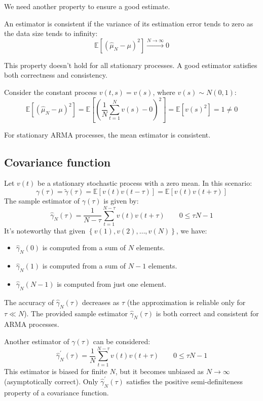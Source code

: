 We need another property to ensure a good estimate. 
\begin{definition}
    An estimator is consistent if the variance of its estimation error tends to zero as the data size tends to infinity:
    \[\mathbb{E}\left[\left(\hat{\mu}_N-\mu\right)^2\right]\overset{N\rightarrow\infty}{\longrightarrow}0\]
\end{definition}
This property doesn't hold for all stationary processes. 
A good estimator satisfies both correctness and consistency.
\begin{example}
    Consider the constant process $v(t,s)=v(s)$, where $v(s) \sim N(0,1)$: 
    \[\mathbb{E}\left[\left(\hat{\mu}_N-\mu\right)^2\right]=\mathbb{E}\left[\left(\dfrac{1}{N}\sum_{t=1}^{N}v(s)-0\right)^2\right]=\mathbb{E}\left[v(s)^2\right]=1\neq 0\]
\end{example}

For stationary ARMA processes, the mean estimator is consistent.

\subsection{Covariance function}
Let $v(t)$ be a stationary stochastic process with a zero mean. 
In this scenario:
\[\gamma(\tau)=\tilde{\gamma}(\tau)=\mathbb{E}\left[ v(t)v(t-\tau) \right]=\mathbb{E}\left[v(t)v(t+\tau)\right]\]
The sample estimator of $\gamma(\tau)$ is given by: 
\[\hat{\gamma}_N(\tau)=\dfrac{1}{N-\tau}\sum_{t=1}^{N-\tau}v(t)v(t+\tau) \qquad 0 \leq \tau N-1\]
It's noteworthy that given $\left\{v(1), v(2), \dots, v(N)\right\}$, we have:
\begin{itemize}
    \item $\hat{\gamma}_N(0)$ is computed from a sum of $N$ elements.
    \item $\hat{\gamma}_N(1)$ is computed from a sum of $N-1$ elements.
    \item $\hat{\gamma}_N(N-1)$ is computed from just one element.
\end{itemize}
The accuracy of $\hat{\gamma}_N(\tau)$ decreases as $\tau$ (the approximation is reliable only for $\tau \ll N$).
The provided sample estimator $\hat{\gamma}_N(\tau)$ is both correct and consistent for ARMA processes.

Another estimator of $\gamma(\tau)$ can be considered:
\[\hat{\gamma}_N^{\prime}(\tau)=\dfrac{1}{N}\sum_{t=1}^{N-\tau}v(t)v(t+\tau) \qquad 0 \leq \tau N-1\]
This estimator is biased for finite $N$, but it becomes unbiased as $N\rightarrow\infty$ (asymptotically correct).
Only $\hat{\gamma}_N^{\prime}(\tau)$ satisfies the positive semi-definiteness property of a covariance function.